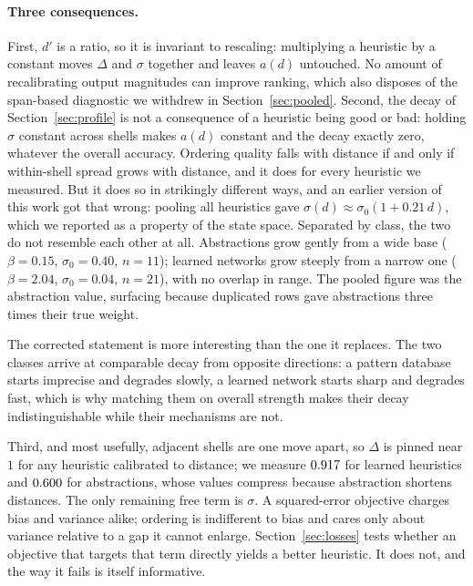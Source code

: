 \documentclass{article}
\begin{document}
\paragraph{Three consequences.} First, $d'$ is a ratio, so it is invariant to
rescaling: multiplying a heuristic by a constant moves $\Delta$ and $\sigma$
together and leaves $a(d)$ untouched. No amount of recalibrating output
magnitudes can improve ranking, which also disposes of the span-based diagnostic
we withdrew in Section~\ref{sec:pooled}. Second, the decay of
Section~\ref{sec:profile} is not a consequence of a heuristic being good or bad:
holding $\sigma$ constant across shells makes $a(d)$ constant and the decay
exactly zero, whatever the overall accuracy. Ordering quality falls with distance
if and only if within-shell spread grows with distance, and it does for every
heuristic we measured. But it does so in strikingly different ways, and an
earlier version of this work got that wrong: pooling all heuristics gave
$\sigma(d) \approx \sigma_0(1+0.21\,d)$, which we reported as a property of the
state space. Separated by class, the two do not resemble each other at all.
Abstractions grow gently from a wide base ($\beta = 0.15$, $\sigma_0 = 0.40$,
$n=11$); learned networks grow steeply from a narrow one ($\beta = 2.04$,
$\sigma_0 = 0.04$, $n=21$), with no overlap in range. The pooled figure was the
abstraction value, surfacing because duplicated rows gave abstractions three
times their true weight.

The corrected statement is more interesting than the one it replaces. The two
classes arrive at comparable decay from opposite directions: a pattern database
starts imprecise and degrades slowly, a learned network starts sharp and degrades
fast, which is why matching them on overall strength makes their decay
indistinguishable while their mechanisms are not.

Third, and most usefully, adjacent shells are one move apart, so $\Delta$ is
pinned near $1$ for any heuristic calibrated to distance; we measure $0.917$
for learned heuristics and $0.600$ for abstractions, whose values compress
because abstraction shortens distances. The only remaining free term is
$\sigma$. A squared-error objective charges bias and variance alike; ordering is
indifferent to bias and cares only about variance relative to a gap it cannot
enlarge. Section~\ref{sec:losses} tests whether an objective that targets that
term directly yields a better heuristic. It does not, and the way it fails is
itself informative.
\end{document}
